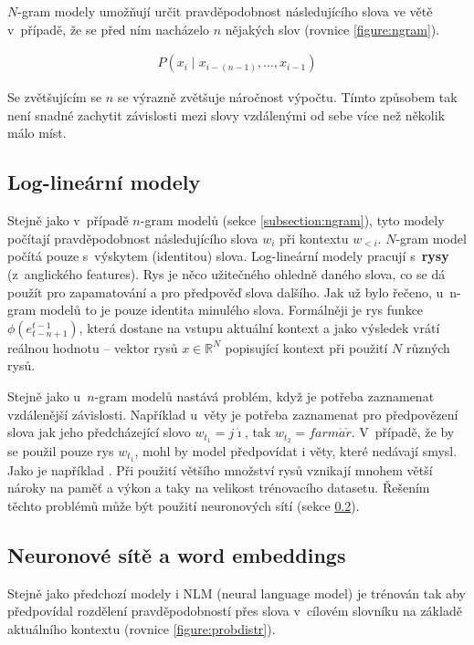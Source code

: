 $N$-gram modely umožňují určit pravděpodobnost následujícího slova ve větě v~případě, že se před ním nacházelo $n$ nějakých slov (rovnice \ref{figure:ngram}).

\begin{align}\label{figure:ngram}
    P(x_{i}\mid x_{{i-(n-1)}},\dots ,x_{{i-1}})
\end{align}

Se zvětšujícím se $n$ se výrazně zvětšuje náročnost výpočtu. Tímto způsobem tak není snadné zachytit závislosti mezi slovy vzdálenými od sebe více než několik málo míst.

\subsection{Log-lineární modely} \label{subsection:loglinear}
Stejně jako v~případě $n$-gram modelů (sekce \ref{subsection:ngram}), tyto modely počítají pravděpodobnost následujícího slova $w_i$ při kontextu $w_{<i}$. $N$-gram model počítá pouze s~výskytem (identitou) slova. Log-lineární modely pracují s~\textbf{rysy} (z~anglického features). Rys je něco užitečného ohledně daného slova, co se dá použít pro zapamatování a pro předpověď slova dalšího. Jak už bylo řečeno, u~n-gram modelů to je pouze identita minulého slova. Formálněji je rys funkce $\phi(e^{t-1}_{t-n+1})$, která dostane na vstupu aktuální kontext a jako výsledek vrátí reálnou hodnotu -- vektor rysů $x \in \mathbb{R}^N$ popisující kontext při použití $N$ různých rysů.

Stejně jako u~$n$-gram modelů nastává problém, když je potřeba zaznamenat vzdálenější závislosti. Například u~věty  je potřeba zaznamenat pro předpovězení slova  jak jeho předcházející slovo $w_{t_1}=j\acute{\imath}$, tak $w_{t_2}=farm\acute{a}\check{r}$. V~případě, že by se použil pouze rys $w_{t_1}$, mohl by model předpovídat i věty, které nedávají smysl. Jako je například . Při použití většího množství rysů vznikají mnohem větší nároky na paměť a výkon a taky na velikost trénovacího datasetu. Řešením těchto problémů může být použití neuronových sítí (sekce \ref{subsection:neuralembeddings}).


\subsection{Neuronové sítě a word embeddings}\label{subsection:neuralembeddings}
Stejně jako předchozí modely i NLM (neural language model) je trénován tak aby předpovídal rozdělení pravděpodobností přes slova v~cílovém slovníku na základě aktuálního kontextu (rovnice \ref{figure:probdistr}).


